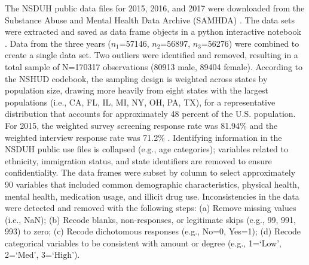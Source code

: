 \documentclass[sigconf]{acmart}
\begin{document}
The NSDUH public data files for 2015, 2016, and 2017 were downloaded from 
the Substance Abuse and Mental Health Data Archive (SAMHDA) \cite{samhsa18}. 
The data sets were extracted and saved as data frame objects in a python 
interactive notebook \cite{mckinney17, vanderplas17}. Data from the three
years ($n_1$=57146, $n_2$=56897, $n_3$=56276) were combined to create a 
single data set. Two outliers were identified and removed, resulting in a
total sample of N=170317 observations (80913 male, 89404 female). 
According to the NSHUD codebook, the sampling design is weighted across 
states by population size, drawing more heavily from eight states with 
the largest populations (i.e., CA, FL, IL, MI, NY, OH, PA, TX), for a 
representative distribution that accounts for approximately 48 percent 
of the U.S. population. For 2015, the weighted survey screening response 
rate was 81.94\% and the weighted interview response rate was 71.2\% 
\cite{samhsa18}. Identifying information in the NSDUH public use files is 
collapsed (e.g., age categories); variables related to ethnicity, immigration 
status, and state identifiers are removed to ensure confidentiality. The data 
frames were subset by column to select approximately 90 variables that 
included common demographic characteristics, physical health, mental health, 
medication usage, and illicit drug use. Inconsistencies in the data were 
detected and removed with the following steps: (a) Remove missing values 
(i.e., NaN); (b) Recode blanks, non-responses, or legitimate skips 
(e.g., 99, 991, 993) to zero; (c) Recode dichotomous responses (e.g., No=0, 
Yes=1); (d) Recode categorical variables to be consistent with amount or 
degree (e.g., 1=`Low', 2=`Med', 3=`High'). 

\end{document}

